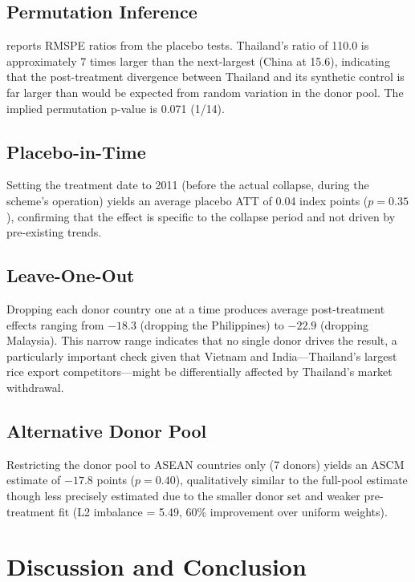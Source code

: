 \documentclass[12pt]{article}
\begin{document}
\subsection{Permutation Inference}

 reports RMSPE ratios from the placebo tests. Thailand's ratio of 110.0 is approximately 7 times larger than the next-largest (China at 15.6), indicating that the post-treatment divergence between Thailand and its synthetic control is far larger than would be expected from random variation in the donor pool. The implied permutation p-value is 0.071 (1/14).



\subsection{Placebo-in-Time}

Setting the treatment date to 2011 (before the actual collapse, during the scheme's operation) yields an average placebo ATT of 0.04 index points ($p = 0.35$), confirming that the effect is specific to the collapse period and not driven by pre-existing trends.

\subsection{Leave-One-Out}

Dropping each donor country one at a time produces average post-treatment effects ranging from $-18.3$ (dropping the Philippines) to $-22.9$ (dropping Malaysia). This narrow range indicates that no single donor drives the result, a particularly important check given that Vietnam and India---Thailand's largest rice export competitors---might be differentially affected by Thailand's market withdrawal.

\subsection{Alternative Donor Pool}

Restricting the donor pool to ASEAN countries only (7 donors) yields an ASCM estimate of $-17.8$ points ($p = 0.40$), qualitatively similar to the full-pool estimate though less precisely estimated due to the smaller donor set and weaker pre-treatment fit (L2 imbalance = 5.49, 60\% improvement over uniform weights).

\section{Discussion and Conclusion}\label{sec:conclusion}
\end{document}
